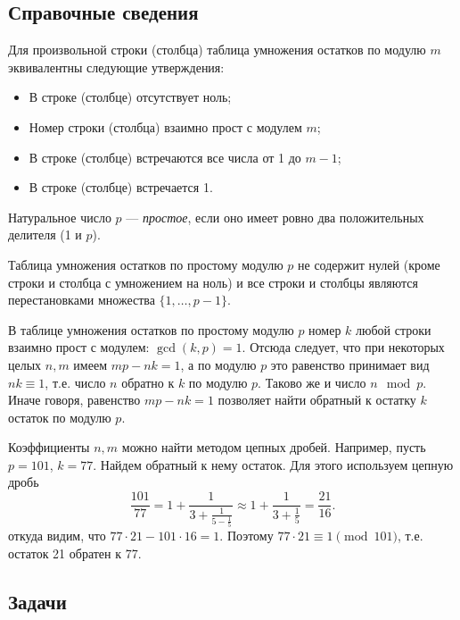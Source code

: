 \subsection*{Справочные сведения}

Для произвольной строки (столбца) таблица умножения остатков по модулю $m$ эквивалентны следующие утверждения:
\begin{itemize}
\item В строке (столбце) отсутствует ноль;
\item Номер строки (столбца) взаимно прост с модулем $m$;
\item В строке (столбце) встречаются все числа от 1 до $m-1$;
\item В строке (столбце) встречается 1.
\end{itemize}

Натуральное число $p$ --- \textit{простое}, если оно имеет ровно два положительных делителя (1 и $p$).

Таблица умножения остатков по простому модулю $p$ не содержит нулей (кроме строки и столбца с умножением на ноль) и все строки и столбцы являются перестановками множества $\{1,\dots,p-1\}$.

В таблице умножения остатков по простому модулю $p$ номер $k$ любой строки взаимно прост с модулем: $\gcd(k,p)=1$. Отсюда следует, что при некоторых целых $n,m$ имеем $mp-nk=1$, а по модулю $p$ это равенство принимает вид $nk\equiv 1$, т.е. число $n$ обратно к $k$ по модулю $p$. Таково же и число $n\mod p$. Иначе говоря, равенство $mp-nk=1$ позволяет найти обратный к остатку $k$ остаток по модулю $p$.

Коэффициенты $n,m$ можно найти методом цепных дробей. Например, пусть $p=101$, $k=77$. Найдем обратный к нему остаток. Для этого используем цепную дробь
$$
\frac{101}{77} = 1+\frac{1}{3+\frac{1}{5-\frac{1}{5}}}\approx
1+\frac{1}{3+\frac{1}{5}}=\frac{21}{16}.
$$
откуда видим, что $77\cdot 21-101\cdot 16=1$. Поэтому $77\cdot 21\equiv 1\pmod{101}$, т.е. остаток 21 обратен к 77.

\subsection*{Задачи}



